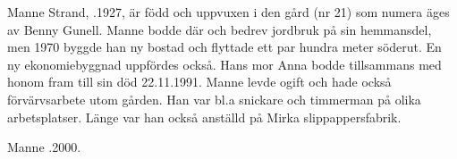 
%
Manne Strand, .1927, är född och uppvuxen i den gård (nr 21) som numera äges av Benny Gunell. Manne bodde där och bedrev jordbruk på sin hemmansdel, men 1970 byggde han ny bostad och flyttade ett  par hundra meter söderut. En ny ekonomiebyggnad uppfördes också. Hans mor Anna bodde tillsammans med honom fram till sin död 22.11.1991. Manne levde ogift och hade också förvärvsarbete utom gården. Han var bl.a snickare och timmerman på olika arbetsplatser. Länge var han också anställd på Mirka slippappersfabrik.

Manne .2000.
